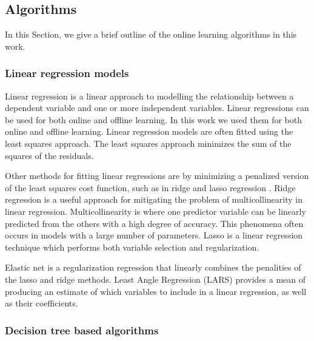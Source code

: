 \documentclass[final,3p,times,twocolumn,numbers]{elsarticle}
\begin{document}

\subsection{Algorithms}

In this Section, we give a brief outline of the online learning algorithms in this work.


\subsubsection{Linear regression models}


Linear regression is a linear approach to modelling the relationship between a dependent variable and one or more independent variables. Linear regressions can be used for both online and offline learning. In this work we used them for both online and offline learning. Linear regression models are often fitted using the least squares approach. The least squares approach minimizes the sum of the squares of the residuals. 

Other methods for fitting linear regressions are by minimizing a penalized version of the least squares cost function, such as in ridge and lasso regression \cite{GeladiPaul1994Mrac, Tibshirani1996a}. Ridge regression is a useful approach for mitigating the problem of multicollinearity in linear regression. Multicollinearity is where one predictor variable can be linearly predicted from the others with a high degree of accuracy. This phenomena often occurs in models with a large number of parameters. Lasso is a linear regression technique which performs both variable selection and regularization. 

Elastic net is a regularization regression that linearly combines the penalities of the lasso and ridge methods. Least Angle Regression (LARS) provides a mean of producing an estimate of which variables to include in a linear regression, as well as their coefficients.


%



\subsubsection{Decision tree based algorithms}
\end{document}
